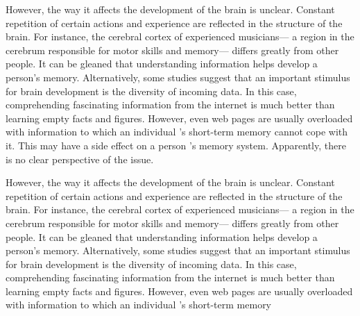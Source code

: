 \documentclass[aps,superscriptaddress,twocolumn,nopreprintnumbers,floatfix,groupedaddress]{revtex4-1}
\begin{document}
However, the way it affects the development of the brain is unclear. Constant repetition of certain actions and experience are reflected in the structure of the brain. For instance, the cerebral cortex of experienced musicians— a region in the cerebrum responsible for motor skills and memory— differs greatly from other people. It can be gleaned that understanding information helps develop a person’s memory. Alternatively, some studies suggest that an important stimulus for brain development is the diversity of incoming data. In this case, comprehending fascinating information from the internet is much better than learning empty facts and figures. However, even web pages are usually overloaded with information to which an individual ’s short-term memory cannot cope with it. This may have a side effect on a person ’s memory system. Apparently, there is no clear perspective of the issue.

However, the way it affects the development of the brain is unclear. Constant repetition of certain actions and experience are reflected in the structure of the brain. For instance, the cerebral cortex of experienced musicians— a region in the cerebrum responsible for motor skills and memory— differs greatly from other people. It can be gleaned that understanding information helps develop a person’s memory. Alternatively, some studies suggest that an important stimulus for brain development is the diversity of incoming data. In this case, comprehending fascinating information from the internet is much better than learning empty facts and figures. However, even web pages are usually overloaded with information to which an individual ’s short-term memory
\end{document}
